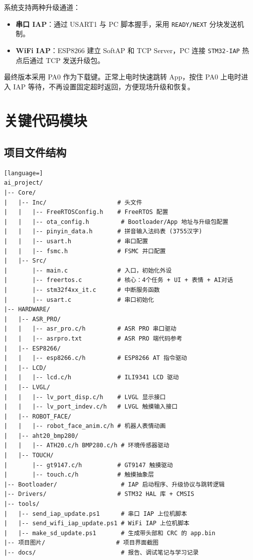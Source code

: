 \documentclass[12pt,a4paper]{ctexart}
\begin{document}
系统支持两种升级通道：

\begin{itemize}
    \item \textbf{串口 IAP}：通过 USART1 与 PC 脚本握手，采用 \texttt{READY/NEXT} 分块发送机制。
    \item \textbf{WiFi IAP}：ESP8266 建立 SoftAP 和 TCP Server，PC 连接 \texttt{STM32-IAP} 热点后通过 TCP 发送升级包。
\end{itemize}

最终版本采用 PA0 作为下载键。正常上电时快速跳转 App，按住 PA0 上电时进入 IAP 等待，不再设置固定超时返回，方便现场升级和恢复。

\section{关键代码模块}

\subsection{项目文件结构}

\begin{lstlisting}[language=]
ai_project/
|-- Core/
|   |-- Inc/                    # 头文件
|   |   |-- FreeRTOSConfig.h    # FreeRTOS 配置
|   |   |-- ota_config.h         # Bootloader/App 地址与升级包配置
|   |   |-- pinyin_data.h       # 拼音输入法码表 (3755汉字)
|   |   |-- usart.h             # 串口配置
|   |   |-- fsmc.h              # FSMC 并口配置
|   |-- Src/
|       |-- main.c              # 入口，初始化外设
|       |-- freertos.c          # 核心：4个任务 + UI + 表情 + AI对话
|       |-- stm32f4xx_it.c      # 中断服务函数
|       |-- usart.c             # 串口初始化
|-- HARDWARE/
|   |-- ASR_PRO/
|   |   |-- asr_pro.c/h         # ASR PRO 串口驱动
|   |   |-- asrpro.txt          # ASR PRO 端代码参考
|   |-- ESP8266/
|   |   |-- esp8266.c/h         # ESP8266 AT 指令驱动
|   |-- LCD/
|   |   |-- lcd.c/h             # ILI9341 LCD 驱动
|   |-- LVGL/
|   |   |-- lv_port_disp.c/h    # LVGL 显示接口
|   |   |-- lv_port_indev.c/h   # LVGL 触摸输入接口
|   |-- ROBOT_FACE/
|   |   |-- robot_face_anim.c/h # 机器人表情动画
|   |-- aht20_bmp280/
|   |   |-- ATH20.c/h BMP280.c/h # 环境传感器驱动
|   |-- TOUCH/
|       |-- gt9147.c/h          # GT9147 触摸驱动
|       |-- touch.c/h           # 触摸抽象层
|-- Bootloader/                  # IAP 启动程序、升级协议与跳转逻辑
|-- Drivers/                    # STM32 HAL 库 + CMSIS
|-- tools/
|   |-- send_iap_update.ps1      # 串口 IAP 上位机脚本
|   |-- send_wifi_iap_update.ps1 # WiFi IAP 上位机脚本
|   |-- make_sd_update.ps1       # 生成带头部和 CRC 的 app.bin
|-- 项目图片/                    # 项目界面截图
|-- docs/                        # 报告、调试笔记与学习记录
\end{lstlisting}
\end{document}
